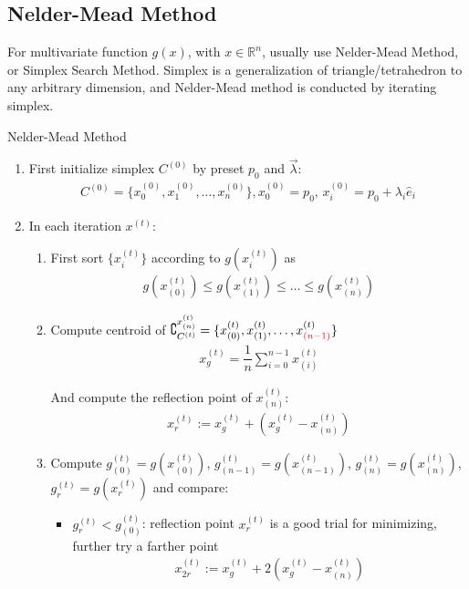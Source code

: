     



\subsection{Nelder-Mead Method}
\hypertarget{Simplex}{}
    For multivariate function $ g(x) $, with $ x\in \mathbb{R}^n $, usually use Nelder-Mead Method, or Simplex Search Method. Simplex is a generalization of triangle/tetrahedron to any arbitrary dimension, and Nelder-Mead method is conducted by iterating simplex.



\begin{algorithm}{Nelder-Mead Method}

\begin{enumerate}[topsep=2pt,itemsep=2pt]
    \item First initialize simplex $ C^{(0)} $ by preset $ p_0 $ and $ \vec{\lambda } $:
    \begin{align}
        C^{(0)}=\{x_0^{(0)},x_1^{(0)},\ldots ,x_n^{(0)}\}, x_0^{(0)}=p_0,\,x_i^{(0)}=p_0+\lambda _i\hat{e}_i
    \end{align}
    \item In each iteration $ x^{(t)} $:
    \begin{enumerate}[topsep=2pt,itemsep=2pt]
        \item First sort $ \{x_i^{(t)}\} $ according to $ g(x_i^{(t)}) $ as
    \begin{align}
        g(x_{(0)}^{(t)})\leq g(x_{(1)}^{(t)})\leq\ldots\leq g(x_{(n)}^{(t)})
    \end{align}
    \item Compute centroid of  $ \complement_{C^{(t)}}^{x_{(n)}^{(t)}}=\{x_{(0)}^{(t)},x_{(1)}^{(t)},\ldots,x^{(t)}_{\color{red}(n-1)}\} $
    \begin{align}
        x_g^{(t)}= \dfrac{1}{n}\sum_{i=0}^{n-1}x_{(i)}^{(t)}
    \end{align}
    
    And compute the reflection point of $ x_{(n)}^{(t)} $:
    \begin{align}
        x_r^{(t)}:=x_g^{(t)}+(x_g^{(t)}-x_{(n)}^{(t)})
    \end{align}
    
    \item Compute $ g_{(0)}^{(t)}=g(x_{(0)}^{(t)}) $, $g_{(n-1)}^{(t)}= g(x_{(n-1)}^{(t)}) $, $ g_{(n)}^{(t)}=g(x_{(n)}^{(t)}) $, $ g_{r}^{(t)}=g(x_{r}^{(t)}) $ and compare:
    \begin{itemize}[topsep=2pt,itemsep=0pt]
        \item $ g_{r}^{(t)}<g_{(0)}^{(t)} $: reflection point $ x_r^{(t)} $ is a good trial for minimizing, further try a farther point
        \begin{align}
            x_{2r}^{(t)}:= x_g^{(t)}+2(x_g^{(t)}-x_{(n)}^{(t)})
        \end{align}
    

\end{itemize}
\end{enumerate}
\end{enumerate}
\end{algorithm}
